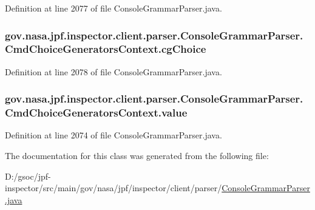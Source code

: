 Definition at line 2077 of file Console\+Grammar\+Parser.\+java.

\subsubsection[{\texorpdfstring{cg\+Choice}{cgChoice}}]{ gov.\+nasa.\+jpf.\+inspector.\+client.\+parser.\+Console\+Grammar\+Parser.\+Cmd\+Choice\+Generators\+Context.\+cg\+Choice}\hypertarget{classgov_1_1nasa_1_1jpf_1_1inspector_1_1client_1_1parser_1_1_console_grammar_parser_1_1_cmd_choice_generators_context_a3cd60475bb50ab9e9930b58121519142}{}\label{classgov_1_1nasa_1_1jpf_1_1inspector_1_1client_1_1parser_1_1_console_grammar_parser_1_1_cmd_choice_generators_context_a3cd60475bb50ab9e9930b58121519142}


Definition at line 2078 of file Console\+Grammar\+Parser.\+java.

\subsubsection[{\texorpdfstring{value}{value}}]{ gov.\+nasa.\+jpf.\+inspector.\+client.\+parser.\+Console\+Grammar\+Parser.\+Cmd\+Choice\+Generators\+Context.\+value}\hypertarget{classgov_1_1nasa_1_1jpf_1_1inspector_1_1client_1_1parser_1_1_console_grammar_parser_1_1_cmd_choice_generators_context_a014d7742f82aa480136081f8bbd0e389}{}\label{classgov_1_1nasa_1_1jpf_1_1inspector_1_1client_1_1parser_1_1_console_grammar_parser_1_1_cmd_choice_generators_context_a014d7742f82aa480136081f8bbd0e389}


Definition at line 2074 of file Console\+Grammar\+Parser.\+java.



The documentation for this class was generated from the following file\+:\begin{DoxyCompactItemize}
\item 
D\+:/gsoc/jpf-\/inspector/src/main/gov/nasa/jpf/inspector/client/parser/\hyperlink{_console_grammar_parser_8java}{Console\+Grammar\+Parser.\+java}\end{DoxyCompactItemize}
